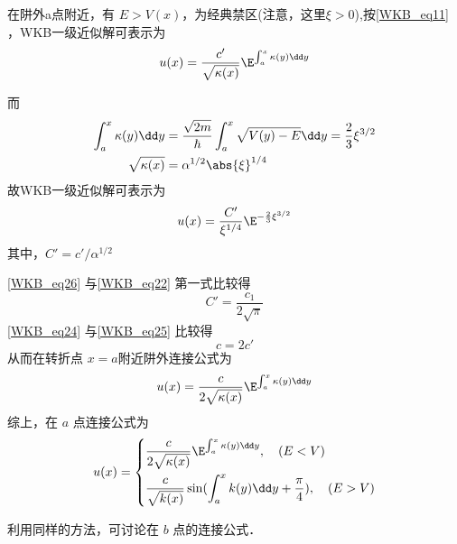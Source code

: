 在阱外a点附近，有 $E>V(x)$，为经典禁区(注意，这里$\xi>0$),按\autoref{WKB_eq11} ，WKB一级近似解可表示为
\begin{equation}
u(x)=\frac{c'}{\sqrt{\kappa(x)}}\E^{\int_a^x\kappa(y)\dd y}
\end{equation}


而
\begin{equation}
\begin{aligned}
\int_a^x\kappa(y)\dd y&=
\frac{\sqrt{2m}}{\hbar}\int_a^x\sqrt{V(y)-E}\dd y=\frac{2}{3}\xi^{3/2}
\\
\sqrt{\kappa(x)}
&=
\alpha^{1/2}\abs{\xi}^{1/4}
\end{aligned}
\end{equation}
故WKB一级近似解可表示为
\begin{equation}\label{WKB_eq26}
u(x)=\frac{C'}{\xi^{1/4}}\E^{-\frac{2}{3}\xi^{3/2}}
\end{equation}
其中，$C'=c'/\alpha^{1/2}$

\autoref{WKB_eq26}  与\autoref{WKB_eq22} 第一式比较得
\begin{equation}\label{WKB_eq24}
C'=\frac{c_1}{2\sqrt{\pi}}
\end{equation}
\autoref{WKB_eq24} 与\autoref{WKB_eq25} 比较得
\begin{equation}
c=2c'
\end{equation}
从而在转折点 $x=a$附近阱外连接公式为
\begin{equation}
u(x)=\frac{c}{2\sqrt{\kappa(x)}}\E^{\int_a^x\kappa(y)\dd y}
\end{equation}
综上，在 $a$ 点连接公式为
\begin{equation}
u(x)=\left\{\begin{aligned}
&\frac{c}{2\sqrt{\kappa(x)}}\E^{\int_a^x\kappa(y)\dd y} ,\quad(E<V)\\
&\frac{c}{\sqrt{k(x)}}\sin(\int_a^x k(y)\dd y+\frac{\pi}{4}),\quad(E>V)
\end{aligned}\right.
\end{equation}

利用同样的方法，可讨论在 $b$ 点的连接公式．

